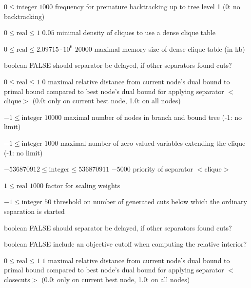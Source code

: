%
{$0\leq\textrm{integer}$}%
{$1000$}%
{frequency for premature backtracking up to tree level 1 (0: no backtracking)}%
{}

%
{$0\leq\textrm{real}\leq1$}%
{$0.05$}%
{minimal density of cliques to use a dense clique table}%
{}

%
{$0\leq\textrm{real}\leq2.09715 \cdot 10^{  6}$}%
{$20000$}%
{maximal memory size of dense clique table (in kb)}%
{}

%
{boolean}%
{FALSE}%
{should separator be delayed, if other separators found cuts?}%
{}

%
{$0\leq\textrm{real}\leq1$}%
{$0$}%
{maximal relative distance from current node's dual bound to primal bound compared to best node's dual bound for applying separator $<$clique$>$ (0.0: only on current best node, 1.0: on all nodes)}%
{}

%
{$-1\leq\textrm{integer}$}%
{$10000$}%
{maximal number of nodes in branch and bound tree (-1: no limit)}%
{}

%
{$-1\leq\textrm{integer}$}%
{$1000$}%
{maximal number of zero-valued variables extending the clique (-1: no limit)}%
{}

%
{$-536870912\leq\textrm{integer}\leq536870911$}%
{$-5000$}%
{priority of separator $<$clique$>$}%
{}

%
{$1\leq\textrm{real}$}%
{$1000$}%
{factor for scaling weights}%
{}

%
{$-1\leq\textrm{integer}$}%
{$50$}%
{threshold on number of generated cuts below which the ordinary separation is started}%
{}

%
{boolean}%
{FALSE}%
{should separator be delayed, if other separators found cuts?}%
{}

%
{boolean}%
{FALSE}%
{include an objective cutoff when computing the relative interior?}%
{}

%
{$0\leq\textrm{real}\leq1$}%
{$1$}%
{maximal relative distance from current node's dual bound to primal bound compared to best node's dual bound for applying separator $<$closecuts$>$ (0.0: only on current best node, 1.0: on all nodes)}%
{}

